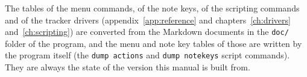 \begin{note}
The tables of the menu commands, of the note keys, of the scripting commands and of the tracker
drivers (appendix~\ref{app:reference} and chapters~\ref{ch:drivers} and~\ref{ch:scripting}) are
converted from the Markdown documents in the \texttt{doc/} folder of the program, and the menu and note key
tables of those are written by the program itself (the \texttt{dump actions} and
\texttt{dump notekeys} script commands). They are always the state of the version this manual
is built from.
\end{note}
